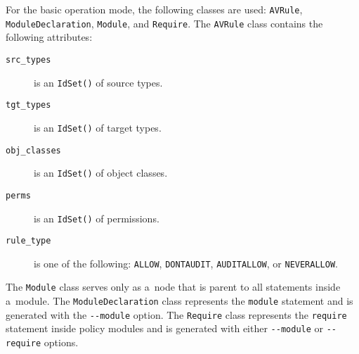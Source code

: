 For the basic operation mode, the following classes are used: \texttt{AVRule},
\texttt{ModuleDeclaration}, \texttt{Module}, and \texttt{Require}. The
\texttt{AVRule} class contains the following attributes:
\begin{description}
    \item [\texttt{src\_types}] is an \texttt{IdSet()} of source types.
    \item [\texttt{tgt\_types}] is an \texttt{IdSet()} of target types.
    \item [\texttt{obj\_classes}] is an \texttt{IdSet()} of object classes.
    \item [\texttt{perms}] is an \texttt{IdSet()} of permissions.
    \item [\texttt{rule\_type}] is one of the following: \texttt{ALLOW},
        \texttt{DONTAUDIT}, \texttt{AUDITALLOW}, or \texttt{NEVERALLOW}.
\end{description}
The \texttt{Module} class serves only as a~node that is parent to all statements
inside a~module. The \texttt{ModuleDeclaration} class represents the
\texttt{module} statement and is generated with the \texttt{-{}-module} option.
The \texttt{Require} class represents the \texttt{require} statement inside
policy modules and is generated with either \texttt{-{}-module} or
\texttt{-{}-require} options.

